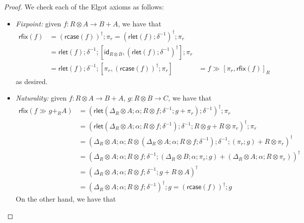\documentclass[acmsmall,screen,review]{acmart}
\newcommand{\ms}[1]{\ensuremath{\mathsf{#1}}}
\newcommand{\dmor}[1]{{\Delta}_{#1}}
\newcommand{\rlmor}[1]{\ms{rlet}(#1)}
\newcommand{\rcase}[1]{\ms{rcase}(#1)}
\newcommand{\rfix}[1]{\ms{rfix}(#1)}
\newcommand{\rseq}[3]{#2 \gg_{#1} #3}
\newcommand{\envcop}[3]{[#2, #3]_{#1}}
\begin{document}
\begin{proof}
  We check each of the Elgot axioms as follows:
  \begin{itemize}
    \item \emph{Fixpoint:} given $f : R \otimes A \to B + A$, we have that
    \begin{equation}
      \begin{aligned}
        \rfix{f} 
        & = (\rcase{f})^\dagger ; \pi_r = (\rlmor{f} ; \delta^{-1})^\dagger ; \pi_r \\  
        & = \rlmor{f} ; \delta^{-1} 
          ; [\ms{id}_{R \otimes B} , (\rlmor{f} ; \delta^{-1})^\dagger] ; \pi_r \\
        & = \rlmor{f} ; \delta^{-1} ; [\pi_r, (\rcase{f})^\dagger ; \pi_r]
        & = \rseq{}{f}{\envcop{R}{\pi_r}{\rfix{f}}}
      \end{aligned}
    \end{equation}
    as desired.
    \item \emph{Naturality:} given $f : R \otimes A \to B + A$, $g: R \otimes B \to C$, we have that
    \begin{equation}
      \begin{aligned}
        \rfix{\rseq{}{f}{g +_R A}} 
        & = (\rlmor{\dmor{R} \otimes A ; \alpha ; R \otimes f ; \delta^{-1} ; g + \pi_r} 
            ; \delta^{-1})^\dagger 
          ; \pi_r \\
        & = (\rlmor{\dmor{R} \otimes A ; \alpha ; R \otimes f ; \delta^{-1}} 
          ; \delta^{-1}; R \otimes g + R \otimes \pi_r)^\dagger 
          ; \pi_r \\
        & = (\dmor{R} \otimes A
          ; \alpha
          ; R \otimes (\dmor{R} \otimes A ; \alpha ; R \otimes f ; \delta^{-1})
          ; \delta^{-1}; (\pi_r ; g) + R \otimes \pi_r)^\dagger \\
        & = (\dmor{R} \otimes A
          ; \alpha 
          ; R \otimes f ; \delta^{-1}
          ; (\dmor{R} \otimes B ; \alpha ; \pi_r ; g) 
          + (\dmor{R} \otimes A ; \alpha ; R \otimes \pi_r))^\dagger \\
        & = (\dmor{R} \otimes A
        ; \alpha 
        ; R \otimes f ; \delta^{-1}
        ; g 
        + R \otimes A)^\dagger \\
        & = (\dmor{R} \otimes A
        ; \alpha 
        ; R \otimes f ; \delta^{-1})^\dagger
        ; g
        = (\rcase{f})^\dagger ; g
      \end{aligned}
    \end{equation}
    On the other hand, we have that

\end{itemize}
\end{proof}
\end{document}
